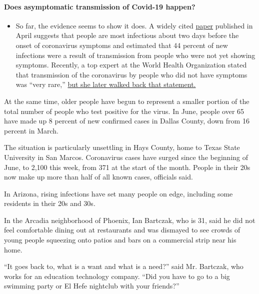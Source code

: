 \begin{itemize}
{  \paragraph{Does asymptomatic transmission of Covid-19
  happen?}\label{does-asymptomatic-transmission-of-covid-19-happen}}

  \begin{itemize}
  \tightlist
  \item
    So far, the evidence seems to show it does. A widely cited
    \href{https://www.nature.com/articles/s41591-020-0869-5}{paper}
    published in April suggests that people are most infectious about
    two days before the onset of coronavirus symptoms and estimated that
    44 percent of new infections were a result of transmission from
    people who were not yet showing symptoms. Recently, a top expert at
    the World Health Organization stated that transmission of the
    coronavirus by people who did not have symptoms was ``very rare,''
    \href{https://www.nytimes.com/2020/06/09/world/coronavirus-updates.html?action=click\&pgtype=Article\&state=default\&region=MAIN_CONTENT_3\&context=storylines_faq\#link-1f302e21}{but
    she later walked back that statement.}
  \end{itemize}
\end{itemize}

At the same time, older people have begun to represent a smaller portion
of the total number of people who test positive for the virus. In June,
people over 65 have made up 8 percent of new confirmed cases in Dallas
County, down from 16 percent in March.

The situation is particularly unsettling in Hays County, home to Texas
State University in San Marcos. Coronavirus cases have surged since the
beginning of June, to 2,100 this week, from 371 at the start of the
month. People in their 20s now make up more than half of all known
cases, officials said.

In Arizona, rising infections have set many people on edge, including
some residents in their 20s and 30s.

In the Arcadia neighborhood of Phoenix, Ian Bartczak, who is 31, said he
did not feel comfortable dining out at restaurants and was dismayed to
see crowds of young people squeezing onto patios and bars on a
commercial strip near his home.

``It goes back to, what is a want and what is a need?'' said Mr.
Bartczak, who works for an education technology company. ``Did you have
to go to a big swimming party or El Hefe nightclub with your friends?''

